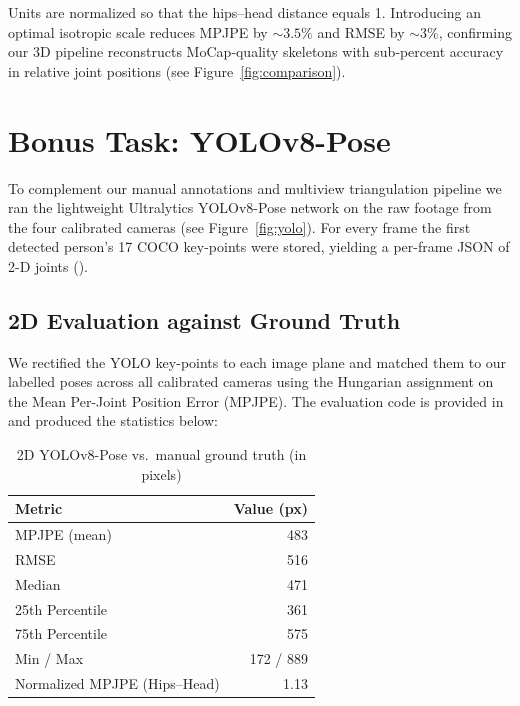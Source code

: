 \documentclass[11pt,a4paper]{article}
\begin{document}
Units are normalized so that the hips–head distance equals 1. Introducing an optimal isotropic scale reduces MPJPE by \(\sim\!3.5\%\) and RMSE by \(\sim\!3\%\), confirming our 3D pipeline reconstructs MoCap‐quality skeletons with sub‐percent accuracy in relative joint positions (see Figure~\ref{fig:comparison}).  

\section*{Bonus Task: YOLOv8-Pose}

To complement our manual annotations and multiview triangulation pipeline we ran the lightweight Ultralytics YOLOv8-Pose network on the raw footage from the four calibrated cameras (see Figure~\ref{fig:yolo}). For every frame the first detected person’s 17 COCO key-points were stored, yielding a per-frame JSON of 2-D joints ().

\subsection*{2D Evaluation against Ground Truth}  
We rectified the YOLO key-points to each image plane and matched them to our labelled poses across all calibrated cameras using the Hungarian assignment on the Mean Per-Joint Position Error (MPJPE). The evaluation code is provided in  and produced the statistics below:

\begin{table}[htbp]
  \centering
  \caption{2D YOLOv8-Pose vs.\ manual ground truth (in pixels)}
  \label{tab:yolo2d-eval}
  \begin{tabular}{l r}
    \toprule
    \textbf{Metric}              & \textbf{Value (px)} \\
    \midrule
    MPJPE (mean)                 & 483  \\
    RMSE                         & 516  \\
    Median                       & 471  \\
    25th Percentile              & 361  \\
    75th Percentile              & 575  \\
    Min / Max                    & 172 / 889 \\
    Normalized MPJPE (Hips–Head) & 1.13 \\
    \bottomrule
  \end{tabular}
\end{table}
\end{document}
